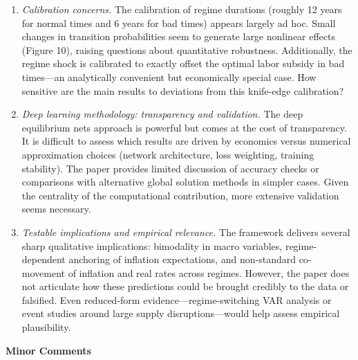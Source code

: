\documentclass[12pt]{article}
\begin{document}
\begin{enumerate}
\item \textit{Calibration concerns.}
The calibration of regime durations (roughly 12 years for normal times and 6 years for bad times) appears largely ad hoc. Small changes in transition probabilities seem to generate large nonlinear effects (Figure 10), raising questions about quantitative robustness. Additionally, the regime shock is calibrated to exactly offset the optimal labor subsidy in bad times---an analytically convenient but economically special case. How sensitive are the main results to deviations from this knife-edge calibration?

\item \textit{Deep learning methodology: transparency and validation.}
The deep equilibrium nets approach is powerful but comes at the cost of transparency. It is difficult to assess which results are driven by economics versus numerical approximation choices (network architecture, loss weighting, training stability). The paper provides limited discussion of accuracy checks or comparisons with alternative global solution methods in simpler cases. Given the centrality of the computational contribution, more extensive validation seems necessary.

\item \textit{Testable implications and empirical relevance.}
The framework delivers several sharp qualitative implications: bimodality in macro variables, regime-dependent anchoring of inflation expectations, and non-standard co-movement of inflation and real rates across regimes. However, the paper does not articulate how these predictions could be brought credibly to the data or falsified. Even reduced-form evidence---regime-switching VAR analysis or event studies around large supply disruptions---would help assess empirical plausibility.

\end{enumerate}

\textbf{Minor Comments}
\end{document}
